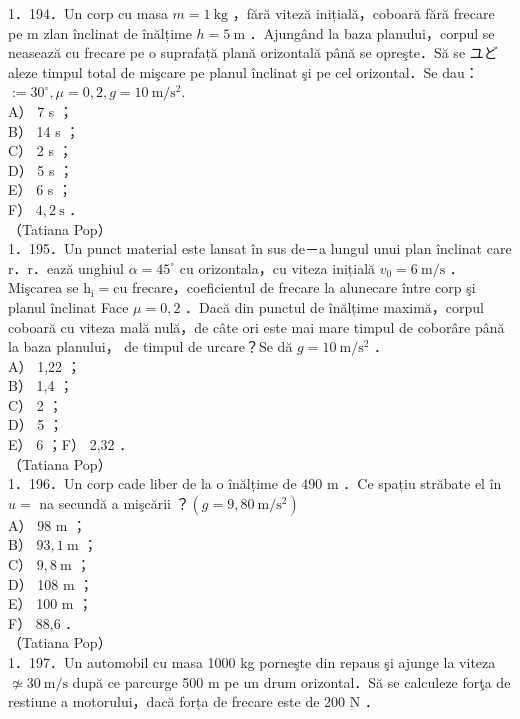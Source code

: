 \documentclass[10pt]{article}
\begin{document}
1．194．Un corp cu masa $m=1 \mathrm{~kg}$ ，fără viteză inițială，coboară fără frecare pe m zlan înclinat de înălțime $h=5 \mathrm{~m}$ ．Ajungând la baza planului，corpul se neasează cu frecare pe o suprafață plană orizontală până se opreşte．Să se ユどaleze timpul total de mişcare pe planul înclinat şi pe cel orizontal．Se dau： $:=30^{\circ}, \mu=0,2, g=10 \mathrm{~m} / \mathrm{s}^{2}$.\\
A） 7 s ；\\
B） 14 s ；\\
C） 2 s ；\\
D） 5 s ；\\
E） 6 s ；\\
F） $4,2 \mathrm{~s}$ ．\\
（Tatiana Pop）\\
1．195．Un punct material este lansat în sus de－a lungul unui plan înclinat care r．r．ează unghiul $\alpha=45^{\circ}$ cu orizontala，cu viteza inițială $v_{0}=6 \mathrm{~m} / \mathrm{s}$ ．Mişcarea se $\mathrm{h}_{\mathrm{i}}=\mathrm{cu}$ frecare，coeficientul de frecare la alunecare între corp şi planul înclinat Face $\mu=0,2$ ．Dacă din punctul de înălțime maximă，corpul coboară cu viteza mală nulă，de câte ori este mai mare timpul de coborâre până la baza planului， de timpul de urcare？Se dă $g=10 \mathrm{~m} / \mathrm{s}^{2}$ ．\\
A） 1,22 ；\\
B） 1,4 ；\\
C） 2 ；\\
D） 5 ；\\
E） 6 ；F） 2,32 ．\\
（Tatiana Pop）\\
1．196．Un corp cade liber de la o înălțime de 490 m ．Ce spațiu străbate el în $u=$ na secundă a mişcării ？$\left(g=9,80 \mathrm{~m} / \mathrm{s}^{2}\right)$\\
A） 98 m ；\\
B） $93,1 \mathrm{~m}$ ；\\
C） $9,8 \mathrm{~m}$ ；\\
D） 108 m ；\\
E） 100 m ；\\
F） 88,6 ．\\
（Tatiana Pop）\\
1．197．Un automobil cu masa 1000 kg porneşte din repaus şi ajunge la viteza $\nsimeq 30 \mathrm{~m} / \mathrm{s}$ după ce parcurge 500 m pe un drum orizontal．Să se calculeze forţa de restiune a motorului，dacă forța de frecare este de 200 N ．\\
\end{document}
